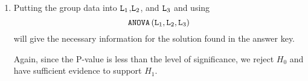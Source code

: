 \documentclass{article}
\newcommand{\calcfunc}[1]{\mbox{\texttt{#1}}}
\begin{document}
\begin{enumerate}
It is important to distinguish which set of data values are ``x"-vales and which set are ``y"-values. On the final exam, this will be made clear and be sure to \textbf{pay attention which one is which}.

\item Putting the group data into $\calcfunc{L}_1$,$\calcfunc{L}_2$, and $\calcfunc{L}_3$ and using $$\calcfunc{ANOVA}\left(\calcfunc{L}_1,\calcfunc{L}_2,\calcfunc{L}_3\right)$$
will give the necessary information for the solution found in the answer key.

Again, since the P-value is less than the level of significance, we reject $H_0$ and have sufficient evidence to support $H_1$.

\end{enumerate}
\end{document}
